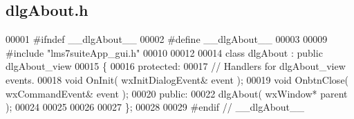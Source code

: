 \subsection{dlg\+About.\+h}
\label{dlgAbout_8h_source}

\begin{DoxyCode}
00001 \textcolor{preprocessor}{#ifndef \_\_dlgAbout\_\_}
00002 \textcolor{preprocessor}{#define \_\_dlgAbout\_\_}
00003 
00009 \textcolor{preprocessor}{#include "lms7suiteApp_gui.h"}
00010 
00012 
00014 \textcolor{keyword}{class }dlgAbout : \textcolor{keyword}{public} dlgAbout_view
00015 \{
00016     \textcolor{keyword}{protected}:
00017         \textcolor{comment}{// Handlers for dlgAbout\_view events.}
00018         \textcolor{keywordtype}{void} OnInit( wxInitDialogEvent& event );
00019         \textcolor{keywordtype}{void} OnbtnClose( wxCommandEvent& event );
00020     \textcolor{keyword}{public}:
00022         dlgAbout( wxWindow* parent );
00024 
00025 
00026 
00027 \};
00028 
00029 \textcolor{preprocessor}{#endif // \_\_dlgAbout\_\_}
\end{DoxyCode}
